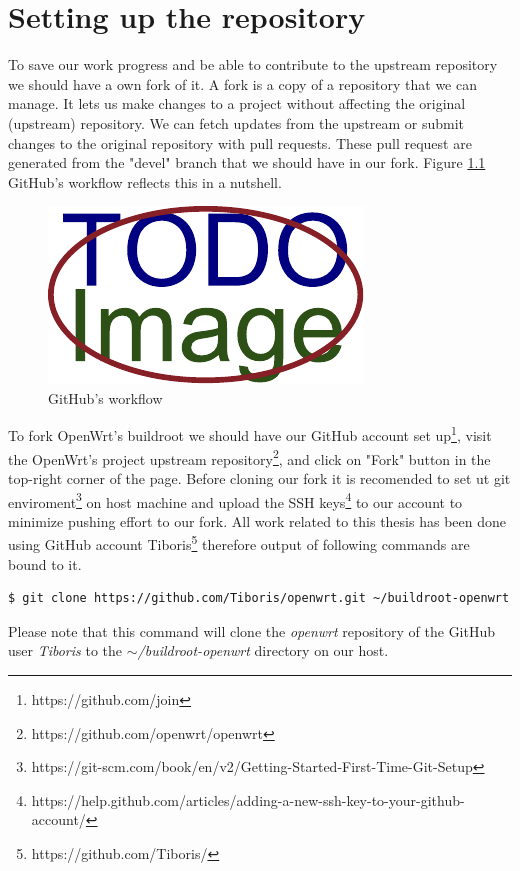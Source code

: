 \chapter{Setting up the repository}\label{set_repo}

To save our work progress and be able to contribute to the upstream repository we should have a own fork of it.
A fork is a copy of a repository that we can manage.
It lets us make changes to a project without affecting the original (upstream) repository.
We can fetch updates from the upstream or submit changes to the original repository with pull requests.
These pull request are generated from the "devel" branch that we should have in our fork.
Figure \ref{fig:git-workflow} GitHub's workflow reflects this in a nutshell.
\begin{figure}[h]
    \centering
    \includegraphics[scale=1]{figures/placeholder.pdf}
    \caption{GitHub's workflow}
    \label{fig:git-workflow}
\end{figure}

To fork OpenWrt's buildroot we should have our GitHub account set up\footnote{https://github.com/join}, visit the OpenWrt's project upstream repository\footnote{https://github.com/openwrt/openwrt}, and click on "Fork" button in the top-right corner of the page.
Before cloning our fork it is recomended to set ut git enviroment\footnote{https://git-scm.com/book/en/v2/Getting-Started-First-Time-Git-Setup} on host machine and upload the SSH keys\footnote{https://help.github.com/articles/adding-a-new-ssh-key-to-your-github-account/} to our account to minimize pushing effort to our fork.
All work related to this thesis has been done using GitHub account Tiboris\footnote{https://github.com/Tiboris/} therefore output of following commands are bound to it.
\begin{lstlisting}[columns=fixed,basicstyle=\ttfamily\footnotesize,tabsize=4,backgroundcolor=\color{yellow!10}]
$ git clone https://github.com/Tiboris/openwrt.git ~/buildroot-openwrt
\end{lstlisting}
Please note that this command will clone the {\it openwrt} repository of the GitHub user {\it Tiboris} to the {\it $\sim$/buildroot-openwrt} directory on our host.

